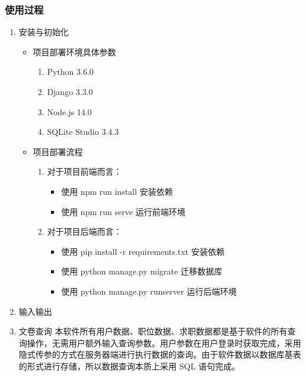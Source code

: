 \documentclass[UTF8,a4paper,10pt]{ctexart}
\begin{document}
\subsubsection{使用过程}


    \begin{enumerate}
        \item 安装与初始化
        \begin{itemize}
            \item 项目部署环境具体参数
            \begin{enumerate}[label=(\alph*)]
                \item Python 3.6.0
                \item Django 3.3.0
                \item Node.js 14.0
                \item SQLite Studio 3.4.3
            \end{enumerate}
            \item 项目部署流程
            \begin{enumerate}[label=(\roman*)]
                \item 对于项目前端而言：
                \begin{itemize}
                    \item 使用 npm run install 安装依赖
                    \item 使用 npm run serve 运行前端环境
                \end{itemize}
                \item 对于项目后端而言：
                \begin{itemize}
                    \item 使用 pip install -r requirements.txt 安装依赖
                    \item 使用 python manage.py migrate 迁移数据库
                    \item 使用 python manage.py runserver 运行后端环境
                \end{itemize}
            \end{enumerate}
        \end{itemize}
        
        \item 输入输出
        
        \item 文卷查询
        本软件所有用户数据、职位数据、求职数据都是基于软件的所有查询操作，无需用户额外输入查询参数。用户参数在用户登录时获取完成，采用隐式传参的方式在服务器端进行执行数据的查询。由于软件数据以数据库基表的形式进行存储，所以数据查询本质上采用 SQL 语句完成。
        

\end{enumerate}
\end{document}
